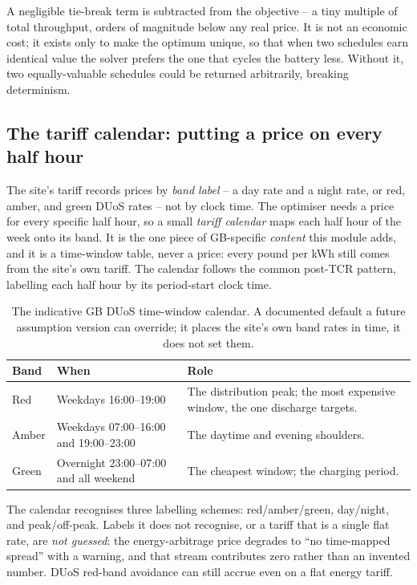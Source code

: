A negligible tie-break term is subtracted from the objective -- a tiny multiple of total throughput, orders of magnitude below any real price. It is not an economic cost; it exists only to make the optimum unique, so that when two schedules earn identical value the solver prefers the one that cycles the battery less. Without it, two equally-valuable schedules could be returned arbitrarily, breaking determinism.

\subsection{The tariff calendar: putting a price on every half hour}

The site's tariff records prices by \emph{band label} -- a day rate and a night rate, or red, amber, and green DUoS rates -- not by clock time. The optimiser needs a price for every specific half hour, so a small \emph{tariff calendar} maps each half hour of the week onto its band. It is the one piece of GB-specific \emph{content} this module adds, and it is a time-window table, never a price: every pound per kWh still comes from the site's own tariff. The calendar follows the common post-TCR pattern, labelling each half hour by its period-start clock time.

\begin{table}[H]
\centering
\caption{The indicative GB DUoS time-window calendar. A documented default a future assumption version can override; it places the site's own band rates in time, it does not set them.}
\label{tab:calendar}
\small\sffamily
\begin{tabularx}{\textwidth}{@{}l l L@{}}
\toprule
\textbf{Band} & \textbf{When} & \textbf{Role} \\
\midrule
Red & Weekdays 16:00--19:00 & The distribution peak; the most expensive window, the one discharge targets. \\
Amber & Weekdays 07:00--16:00 and 19:00--23:00 & The daytime and evening shoulders. \\
Green & Overnight 23:00--07:00 and all weekend & The cheapest window; the charging period. \\
\bottomrule
\end{tabularx}
\end{table}

The calendar recognises three labelling schemes: red/amber/green, day/night, and peak/off-peak. Labels it does not recognise, or a tariff that is a single flat rate, are \emph{not guessed}: the energy-arbitrage price degrades to ``no time-mapped spread'' with a warning, and that stream contributes zero rather than an invented number. DUoS red-band avoidance can still accrue even on a flat energy tariff.

